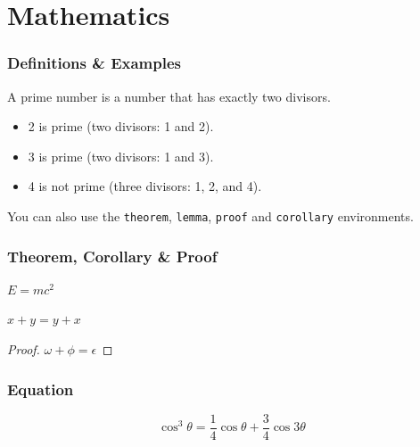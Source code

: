\documentclass[
	10pt, %
]{beamer}
\begin{document}
\section{Mathematics}

\begin{frame}
	\frametitle{Definitions \& Examples}
	
	\begin{definition}
		A \alert{prime number} is a number that has exactly two divisors.
	\end{definition}
	
	\smallskip %
	
	\begin{example}
		\begin{itemize}
			\item 2 is prime (two divisors: 1 and 2).
			\item 3 is prime (two divisors: 1 and 3).
			\item 4 is not prime (\alert{three} divisors: 1, 2, and 4).
		\end{itemize}
	\end{example}
	
	\smallskip %
	
	You can also use the \texttt{theorem}, \texttt{lemma}, \texttt{proof} and \texttt{corollary} environments.
\end{frame}


\begin{frame}
	\frametitle{Theorem, Corollary \& Proof}
	
	\begin{theorem}
		$E = mc^2$
	\end{theorem}
	
	\begin{corollary}
		$x + y = y + x$
	\end{corollary}
	
	\begin{proof}
		$\omega + \phi = \epsilon$
	\end{proof}
\end{frame}


\begin{frame}
	\frametitle{Equation}

	\begin{equation}
		\cos^3 \theta =\frac{1}{4}\cos\theta+\frac{3}{4}\cos 3\theta
	\end{equation}
\end{frame}
\end{document}
